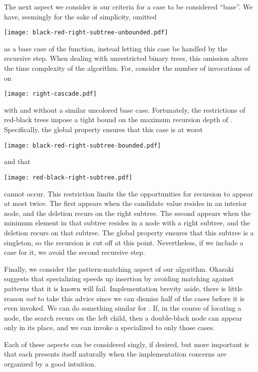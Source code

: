 \documentclass[preprint]{sigplanconf}
\begin{document}
The next aspect we consider is our criteria for a case to be considered
``base''. We have, seemingly for the sake of simplicity, omitted
\begin{center}
\texttt{[image: black-red-right-subtree-unbounded.pdf]}
\end{center}
as a base case of the  function, instead letting this case be
handled by the recursive step. When dealing with unrestricted binary trees, this
omission alters the time complexity of the algorithm. For, consider the number
of invocations of  on
\begin{center}
\texttt{[image: right-cascade.pdf]}
\end{center}
with and without a similar uncolored base case. Fortunately, the restrictions of
red-black trees impose a tight bound on the maximum recursion depth of
. Specifically, the global property ensures that this case is at
worst
\begin{center}
\texttt{[image: black-red-right-subtree-bounded.pdf]}
\end{center}
and that
\begin{center}
\texttt{[image: red-black-right-subtree.pdf]}
\end{center}
cannot occur. This restriction limits the the opportunities for recursion to
appear at most twice. The first appears when the candidate value resides in an
interior node, and the deletion recurs on the right subtree. The second appears
when the minimum element in that subtree resides in a node with a right subtree,
and the deletion recurs on that subtree. The global property ensures that this
subtree is a singleton, so the recursion is cut off at this point. Nevertheless,
if we include a case for it, we avoid the second recursive step.

Finally, we consider the pattern-matching aspect of our algorithm. Okasaki
suggests that specializing  speeds up insertion by avoiding
matching against patterns that it is known will fail. Implementation brevity
aside, there is little reason \emph{not} to take this advice since we can
dismiss half of the  cases before it is even invoked. We can do
something similar for . If, in the course of locating a node, the
search recurs on the left child, then a double-black node can appear only in its
place, and we can invoke a  specialized to only those cases.

Each of these aspects can be considered singly, if desired, but more important
is that each presents itself naturally when the implementation concerns are
organized by a good intuition.
\end{document}
